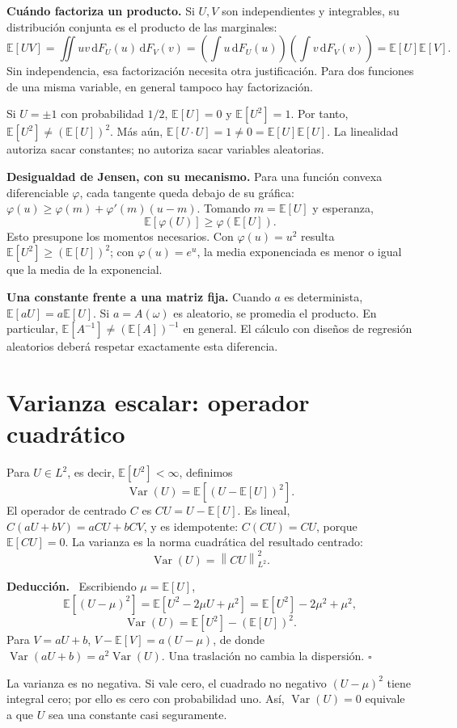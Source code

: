 \documentclass[11pt,a4paper]{article}
\newcommand{\E}{\mathbb E}
\newcommand{\dd}{\,\mathrm d}
\newcommand{\norm}[1]{\left\lVert #1\right\rVert}
\DeclareMathOperator{\Var}{Var}
\newcommand{\topic}[2]{\clearpage\section{#1}\label{#2}}
\newenvironment{deduccion}{\par\textbf{Deducción.}\ }{\hfill$\square$\par}
\theoremstyle{definition}\newtheorem{definicion}[teorema]{Definición}
\begin{document}
\textbf{Cuándo factoriza un producto.} Si $U,V$ son independientes y
integrables, su distribución conjunta es el producto de las marginales:
\[
\E[UV]=\iint uv\dd F_U(u)\dd F_V(v)
=\left(\int u\dd F_U(u)\right)
\left(\int v\dd F_V(v)\right)=\E[U]\E[V].
\]
Sin independencia, esa factorización necesita otra justificación. Para dos
funciones de una misma variable, en general tampoco hay factorización.

\begin{ejemplo}
Si $U=\pm1$ con probabilidad $1/2$,
$\E[U]=0$ y $\E[U^2]=1$. Por tanto, $\E[U^2]\ne(\E[U])^2$.
Más aún, $\E[U\cdot U]=1\ne0=\E[U]\E[U]$.
La linealidad autoriza sacar constantes; no autoriza sacar variables aleatorias.
\end{ejemplo}
\textbf{Desigualdad de Jensen, con su mecanismo.}
Para una función convexa diferenciable $\varphi$, cada tangente queda
debajo de su gráfica:
$\varphi(u)\ge\varphi(m)+\varphi'(m)(u-m)$.
Tomando $m=\E[U]$ y esperanza,
\[
\boxed{\E[\varphi(U)]\ge\varphi(\E[U])}.
\]
Esto presupone los momentos necesarios. Con $\varphi(u)=u^2$ resulta
$\E[U^2]\ge(\E[U])^2$; con $\varphi(u)=e^u$, la media exponenciada
es menor o igual que la media de la exponencial.

\textbf{Una constante frente a una matriz fija.} Cuando $a$ es determinista,
$\E[aU]=a\E[U]$. Si $a=A(\omega)$ es aleatorio, se promedia el producto.
En particular, $\E[A^{-1}]\ne(\E[A])^{-1}$ en general. El cálculo con
diseños de regresión aleatorios deberá respetar exactamente esta diferencia.

\topic{Varianza escalar: operador cuadrático}{s08}
Para $U\in L^2$, es decir, $\E[U^2]<\infty$, definimos
\[
\Var(U)=\E[(U-\E[U])^2].
\]
El operador de centrado $C$ es $CU=U-\E[U]$. Es lineal,
$C(aU+bV)=aCU+bCV$, y es idempotente: $C(CU)=CU$, porque $\E[CU]=0$.
La varianza es la norma cuadrática del resultado centrado:
\[
\Var(U)=\norm{CU}_{L^2}^2.
\]

\begin{deduccion}
Escribiendo $\mu=\E[U]$,
\[
\E[(U-\mu)^2]=\E[U^2-2\mu U+\mu^2]
=\E[U^2]-2\mu^2+\mu^2,
\]
\[
\boxed{\Var(U)=\E[U^2]-(\E[U])^2}.
\]
Para $V=aU+b$, $V-\E[V]=a(U-\mu)$, de donde
$\boxed{\Var(aU+b)=a^2\Var(U)}$. Una traslación no cambia la dispersión.
\end{deduccion}
La varianza es no negativa. Si vale cero, el cuadrado no negativo
$(U-\mu)^2$ tiene integral cero; por ello es cero con probabilidad uno.
Así, $\Var(U)=0$ equivale a que $U$ sea una constante casi seguramente.
\end{document}
